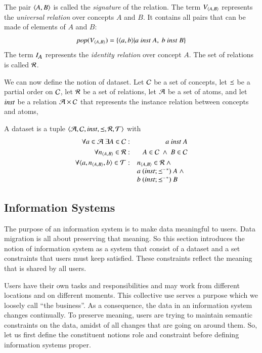 \documentclass{elsarticle}
\begin{document}
	The pair $\langle{A},{B}\rangle$ is called the \emph{signature} of the relation.
	The term $V_{\langle{A},{B}\rangle}$ represents the \emph{universal relation} over concepts $A$ and $B$.
	It contains all pairs that can be made of elements of $A$ and $B$:
\[\text{\it pop\/}(V_{\langle{A},{B}\rangle}) = \{ \langle{a},{b}\rangle| a\ \text{\it inst\/}\ A,\ b\ \text{\it inst\/}\ B \}\]
	The term $I_{\text{\it \small A\/}}$ represents the \emph{identity relation} over concept $A$.
	The set of relations is called $\mathcal{R}$.
	
	We can now define the notion of dataset.
	Let	$\mathcal{C}$ be a set of concepts,
	let $\preceq$ be a partial order on $\mathcal{C}$,
	let $\mathcal{R}$ be a set of relations,
	let $\mathcal{A}$ be a set of atoms,
	and let $\text{\it inst\/}$ be a relation $\mathcal{A}\times\mathcal{C}$ that represents the instance relation between concepts and atoms,
\begin{definition}[dataset]
	\label{def:dataset}
	\item A dataset is a tuple $\langle\mathcal{A},\mathcal{C},\text{\it inst\/},\preceq,\mathcal{R},\mathcal{T}\rangle$ with
	\begin{eqnarray}
		\forall a\in\atoms\ \exists A\in\concepts&:&a\ \inst\ A\\
		\forall \declare{n}{A}{B}\in\rels&:&A\in\concepts\ \wedge\ B\in\concepts\\
		\forall\triple{a}{\declare{n}{A}{B}}{b}\in\triples&:&\begin{array}[t]{@{}l}\declare{n}{A}{B}\in\rels\ \wedge\\ a\ (\inst \compose \kleenestar{\flip{\isa}})\ A\ \wedge\\ b\ (\inst \compose \kleenestar{\flip{\isa}})\ B\end{array}
	\end{eqnarray}
\end{definition}

\subsection{Information Systems}
\label{sct:Information Systems}
	The purpose of an information system is to make data meaningful to users.
	Data migration is all about preserving that meaning.
	So this section introduces the notion of information system
	as a system that consist of a dataset and a set constraints that users must keep satisfied.
	These constraints reflect the meaning that is shared by all users.

	Users have their own tasks and responsibilities
	and may work from different locations and on different moments.
	This collective use serves a purpose which we loosely call ``the business''.
	As a consequence, the data in an information system changes continually.
	To preserve meaning, users are trying to maintain semantic constraints on the data,
	amidst of all changes that are going on around them.
	So, let us first define the constituent notions role and constraint before defining information systems proper.
\end{document}
